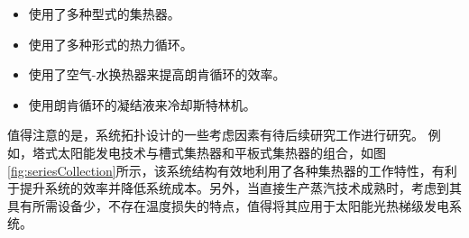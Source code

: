 \begin{itemize}
  \item 使用了多种型式的集热器。
  \item 使用了多种形式的热力循环。
  \item 使用了空气-水换热器来提高朗肯循环的效率。
  \item 使用朗肯循环的凝结液来冷却斯特林机。
\end{itemize}

值得注意的是，系统拓扑设计的一些考虑因素有待后续研究工作进行研究。 例如，塔式太阳能发电技术与槽式集热器和平板式集热器的组合，如图\ref{fig:seriesCollection}所示，该系统结构有效地利用了各种集热器的工作特性，有利于提升系统的效率并降低系统成本。另外，当直接生产蒸汽技术成熟时，考虑到其具有所需设备少，不存在温度损失的特点，值得将其应用于太阳能光热梯级发电系统。